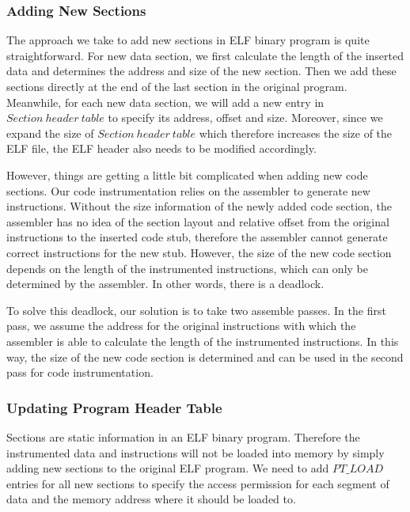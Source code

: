 \subsubsection{\bf{Adding New Sections}}
The approach we take to add new sections in ELF binary program is quite straightforward. For new data section, we first calculate the length of the inserted data and determines the address and size of the new section. Then we add these sections directly at the end of the last section in the original program. Meanwhile, for each new data section, we will add a new entry in $Section\ header\ table$ to specify its address, offset and size. Moreover, since we expand the size of $Section\ header\ table$ which therefore increases the size of the ELF file, the ELF header also needs to be modified accordingly.

However, things are getting a little bit complicated when adding new code sections. Our code instrumentation relies on the assembler to generate new instructions. Without the size information of the newly added code section, the assembler has no idea of the section layout and relative offset from the original instructions to the inserted code stub, therefore the assembler cannot generate correct instructions for the new stub. However, the size of the new code section depends on the length of the instrumented instructions, which can only be determined by the assembler. In other words, there is a deadlock.

To solve this deadlock, our solution is to take two assemble passes. In the first pass, we assume the address for the original instructions with which the assembler is able to calculate the length of the instrumented instructions. In this way, the size of the new code section is determined and can be used in the second pass for code instrumentation.

\vspace{5pt} 
\subsubsection{\bf{Updating Program Header Table}}
Sections are static information in an ELF binary program. Therefore the instrumented data and instructions will not be loaded into memory by simply adding new sections to the original ELF program. We need to add $PT\_LOAD$ entries for all new sections to specify the access permission for each segment of data and the memory address where it should be loaded to.

